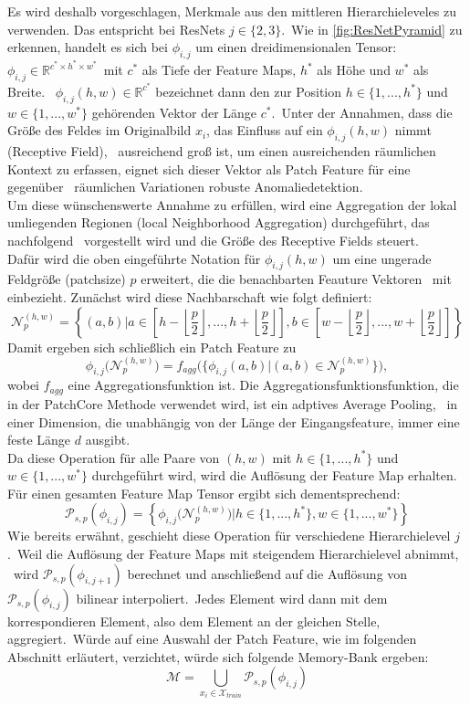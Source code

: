 Es wird deshalb vorgeschlagen, Merkmale aus den mittleren Hierarchieleveles zu verwenden. Das entspricht bei ResNets $j\in \{2,3\}$.\
Wie in \ref{fig:ResNetPyramid} zu erkennen, handelt es sich bei $\phi_{i,j}$ um einen dreidimensionalen Tensor: $\phi_{i,j}\in \mathbb{R}^{c^{*}\times h^{*}\times w^{*}}$\
mit $c^{*}$ als Tiefe der Feature Maps, $h^{*}$ als Höhe und $w^{*}$ als Breite. \
$\phi_{i,j}(h,w)\in\mathbb{R}^{c^{*}}$ bezeichnet dann den zur Position $h\in\{1,...,h^{*}\}$ und $w\in\{1,...,w^{*}\}$ gehörenden Vektor der Länge $c^{*}$.\
Unter der Annahmen, dass die Größe des Feldes im Originalbild $x_{i}$, das Einfluss auf ein $\phi_{i,j}(h,w)$ nimmt (\glqq Receptive Field\grqq{}), \
ausreichend groß ist, um einen ausreichenden räumlichen Kontext zu erfassen, eignet sich dieser Vektor als \glqq Patch Feature\grqq{} für eine gegenüber \ 
räumlichen Variationen robuste Anomaliedetektion.\\
Um diese wünschenswerte Annahme zu erfüllen, wird eine Aggregation der lokal umliegenden Regionen (\glqq local Neighborhood Aggregation\grqq{}) durchgeführt, das nachfolgend \
vorgestellt wird und die Größe des Receptive Fields steuert.\\
Dafür wird die oben eingeführte Notation für $\phi_{i,j}(h,w)$ um eine ungerade Feldgröße (\glqq patchsize\grqq{}) $p$ erweitert, die die benachbarten Feauture Vektoren \
mit einbezieht. Zunächst wird diese Nachbarschaft wie folgt definiert:\
$$
\mathcal{N}_{p}^{(h,w)} = \left\{(a,b)| a \in \left[h-\left\lfloor \frac{p}{2}\right\rfloor,...,h+\left\lfloor \frac{p}{2} \right\rfloor\right], b \in \left[w-\left\lfloor \frac{p}{2}\right\rfloor,...,w+\left\lfloor \frac{p}{2}\right\rfloor\right]\right\}
$$ 
Damit ergeben sich schließlich ein \glqq Patch Feature\grqq{} zu\
$$
\phi_{i,j}\Big(\mathcal{N}_{p}^{(h,w)}\Big) = f_{agg}\Big(\{\phi_{i,j}(a,b)| (a,b) \in \mathcal{N}_{p}^{(h,w)}\}\Big),
$$
wobei $f_{agg}$ eine Aggregationsfunktion ist. Die Aggregationsfunktionsfunktion, die in der PatchCore Methode verwendet wird, ist ein adptives \glqq Average Pooling\grqq{}, \
in einer Dimension, die unabhängig von der Länge der Eingangsfeature, immer eine feste Länge $d$ ausgibt.\\
Da diese Operation für alle Paare von $(h,w)$ mit $h\in\{1,...,h^{*}\}$ und $w\in\{1,...,w^{*}\}$ durchgeführt wird, wird die Auflösung der Feature Map erhalten.
Für einen gesamten Feature Map Tensor ergibt sich dementsprechend:\
$$
\mathcal{P}_{s,p}\left(\phi_{i,j}\right) = \left\{\phi_{i,j}\Big(\mathcal{N}_{p}^{(h,w)}\Big)| h\in\{1,...,h^{*}\}, w\in\{1,...,w^{*}\}\right\}
$$
Wie bereits erwähnt, geschieht diese Operation für verschiedene Hierarchielevel $j$.\ Weil die Auflösung der Feature Maps mit steigendem Hierarchielevel abnimmt, \
wird $\mathcal{P}_{s,p}\left(\phi_{i,j+1}\right)$ berechnet und anschließend auf die Auflösung von $\mathcal{P}_{s,p}\left(\phi_{i,j}\right)$ bilinear interpoliert.\ 
Jedes Element wird dann mit dem korrespondieren Element, also dem Element an der gleichen Stelle, aggregiert.\
Würde auf eine Auswahl der Patch Feature, wie im folgenden Abschnitt erläutert, verzichtet, würde sich folgende Memory-Bank ergeben:
$$
\mathcal{M} = \bigcup_{x_i\in\mathcal{X}_{train}}\mathcal{P}_{s,p}\left(\phi_{i,j}\right)
$$
